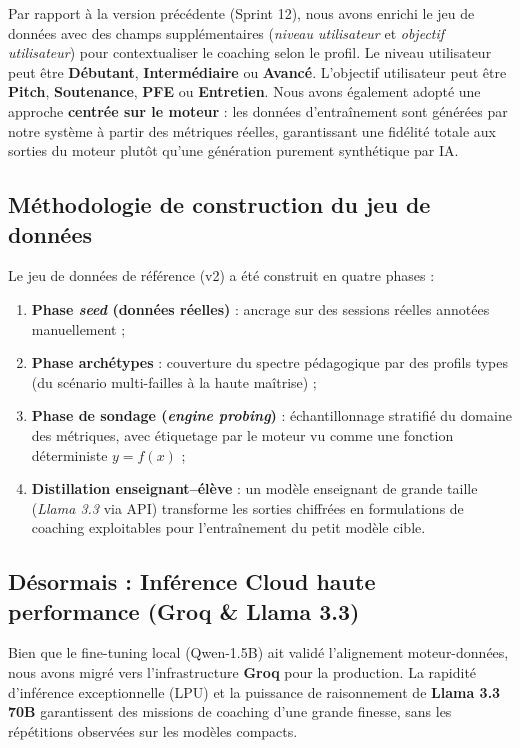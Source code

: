 ﻿\documentclass[12pt,a4paper]{article}
\begin{document}
Par rapport à la version précédente (Sprint 12), nous avons enrichi le jeu de données avec des champs supplémentaires (\textit{niveau utilisateur} et \textit{objectif utilisateur}) pour contextualiser le coaching selon le profil. Le niveau utilisateur peut être \textbf{Débutant}, \textbf{Intermédiaire} ou \textbf{Avancé}. L'objectif utilisateur peut être \textbf{Pitch}, \textbf{Soutenance}, \textbf{PFE} ou \textbf{Entretien}. Nous avons également adopté une approche \textbf{centrée sur le moteur} : les données d'entraînement sont générées par notre système à partir des métriques réelles, garantissant une fidélité totale aux sorties du moteur plutôt qu'une génération purement synthétique par IA.

\subsection{Méthodologie de construction du jeu de données}
Le jeu de données de référence (v2) a été construit en quatre phases :
\begin{enumerate}
    \item \textbf{Phase \textit{seed} (données réelles)} : ancrage sur des sessions réelles annotées manuellement ;
    \item \textbf{Phase archétypes} : couverture du spectre pédagogique par des profils types (du scénario multi-failles à la haute maîtrise) ;
    \item \textbf{Phase de sondage (\textit{engine probing})} : échantillonnage stratifié du domaine des métriques, avec étiquetage par le moteur vu comme une fonction déterministe $y = f(x)$ ;
    \item \textbf{Distillation enseignant--élève} : un modèle enseignant de grande taille (\textit{Llama 3.3} via API) transforme les sorties chiffrées en formulations de coaching exploitables pour l'entraînement du petit modèle cible.
\end{enumerate}

\subsection{Désormais : Inférence Cloud haute performance (Groq \& Llama 3.3)}
Bien que le fine-tuning local (Qwen-1.5B) ait validé l'alignement moteur-données, nous avons migré vers l'infrastructure \textbf{Groq} pour la production. La rapidité d'inférence exceptionnelle (LPU) et la puissance de raisonnement de \textbf{Llama 3.3 70B} \cite{meta2024llama} garantissent des missions de coaching d'une grande finesse, sans les répétitions observées sur les modèles compacts.
\end{document}
